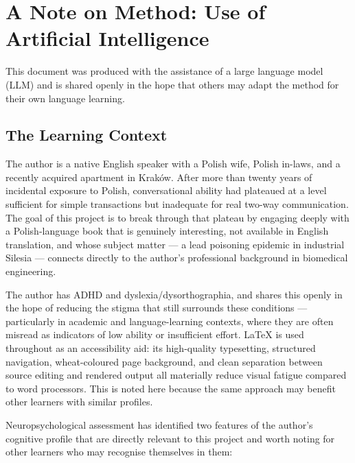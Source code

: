
\chapter*{A Note on Method: Use of Artificial Intelligence}

This document was produced with the assistance of a large language
model (LLM) and is shared openly in the hope that others may adapt
the method for their own language learning.

\section*{The Learning Context}

The author is a native English speaker with a Polish wife, Polish
in-laws, and a recently acquired apartment in Kraków. After more than
twenty years of incidental exposure to Polish, conversational ability
had plateaued at a level sufficient for simple transactions but
inadequate for real two-way communication. The goal of this project
is to break through that plateau by engaging deeply with a Polish-language
book that is genuinely interesting, not available in English translation,
and whose subject matter --- a lead poisoning epidemic in industrial
Silesia --- connects directly to the author's professional background
in biomedical engineering.

The author has ADHD and dyslexia/dysorthographia, and shares this
openly in the hope of reducing the stigma that still surrounds these
conditions --- particularly in academic and language-learning contexts,
where they are often misread as indicators of low ability or
insufficient effort. \LaTeX{} is used throughout as an accessibility
aid: its high-quality typesetting, structured navigation,
wheat-coloured page background, and clean separation between source
editing and rendered output all materially reduce visual fatigue
compared to word processors. This is noted here because the same
approach may benefit other learners with similar profiles.

Neuropsychological assessment has identified two features of the
author's cognitive profile that are directly relevant to this
project and worth noting for other learners who may recognise
themselves in them:

